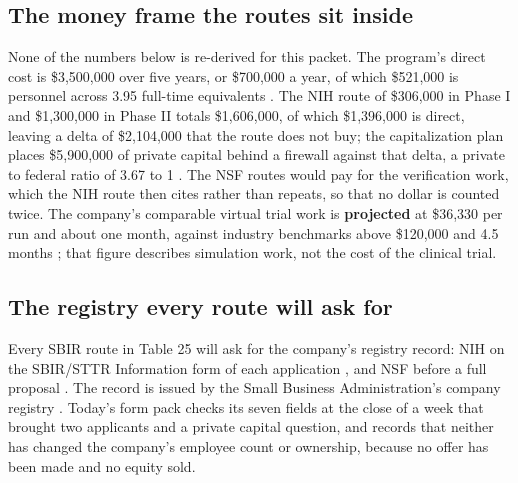 \subsection{The money frame the routes sit inside}

None of the numbers below is re-derived for this packet. The program's direct
cost is \$3,500,000 over five years, or \$700,000 a year, of which \$521,000 is
personnel across 3.95 full-time equivalents \cite{movein2026}. The NIH route of
\$306,000 in Phase I and \$1,300,000 in Phase II totals \$1,606,000, of which
\$1,396,000 is direct, leaving a delta of \$2,104,000 that the route does not
buy; the capitalization plan places \$5,900,000 of private capital behind a
firewall against that delta, a private to federal ratio of 3.67 to 1
\cite{capitalplan2026}. The NSF routes \cite{nsf26510,nsfncti2026} would pay for
the verification work, which the NIH route then cites rather than repeats, so
that no dollar is counted twice. The company's comparable virtual trial work is
\textbf{projected} at \$36,330 per run and about one month, against industry
benchmarks above \$120,000 and 4.5 months \cite{capitalplan2026}; that figure
describes simulation work, not the cost of the clinical trial.

\subsection{The registry every route will ask for}

Every SBIR route in Table 25 will ask for the company's registry record: NIH on
the SBIR/STTR Information form of each application \cite{nihg440}, and NSF before
a full proposal \cite{nsfsbaregistry}. The record is issued by the Small Business
Administration's company registry \cite{sbacompanyreg2026}. Today's form pack
checks its seven fields at the close of a week that brought two applicants and a
private capital question, and records that neither has changed the company's
employee count or ownership, because no offer has been made and no equity sold.
